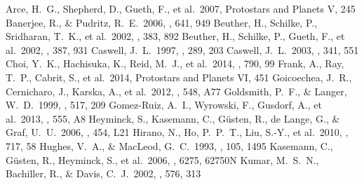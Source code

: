\documentclass[twocolumn]{aastex62}
\begin{document}








\begin{thebibliography}{}
 Arce, H.~G., Shepherd, D., Gueth, F., et al.\ 2007, Protostars and Planets V, 245 
 Banerjee, R., \& Pudritz, R.~E.\ 2006, \apj, 641, 949 
 Beuther, H., Schilke, P., Sridharan, T.~K., et al.\ 2002, \aap, 383, 892
 Beuther, H., Schilke, P., Gueth, F., et al.\ 2002, \aap, 387, 931 
 Caswell, J.~L.\ 1997, \mnras, 289, 203 
 Caswell, J.~L.\ 2003, \mnras, 341, 551 
 Choi, Y.~K., Hachisuka, K., Reid, M.~J., et al.\ 2014, \apj, 790, 99 
 Frank, A., Ray, T.~P., Cabrit, S., et al.\ 2014, Protostars and Planets VI, 451
 Goicoechea, J.~R., Cernicharo, J., Karska, A., et al.\ 2012, \aap, 548, A77 
 Goldsmith, P.~F., \& Langer, W.~D.\ 1999, \apj, 517, 209
 Gomez-Ruiz, A.~I., Wyrowski, F., Gusdorf, A., et al.\ 2013, \aap, 555, A8
 Heyminck, S., Kasemann, C., G{\"u}sten, R., de Lange, G., \& Graf, U.~U.\ 2006, \aap, 454, L21 
 Hirano, N., Ho, P.~P.~T., Liu, S.-Y., et al.\ 2010, \apj, 717, 58
 Hughes, V.~A., \& MacLeod, G.~C.\ 1993, \aj, 105, 1495
 Kasemann, C., G{\"u}sten, R., Heyminck, S., et al.\ 2006, \procspie, 6275, 62750N 
 Kumar, M.~S.~N., Bachiller, R., \& Davis, C.~J.\ 2002, \apj, 576, 313 

\end{thebibliography}
\end{document}
